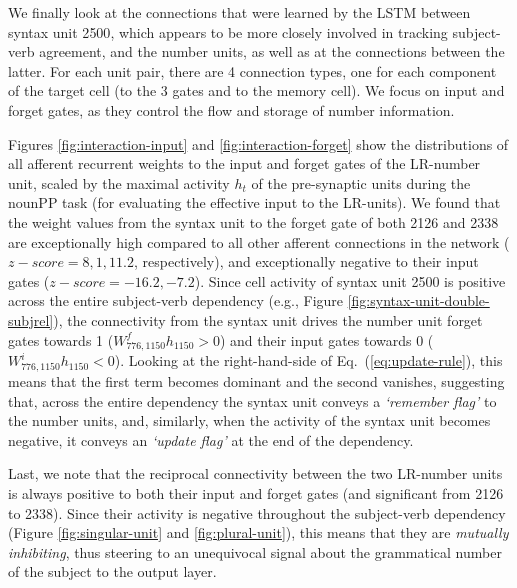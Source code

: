 We finally look at the connections that were learned by the LSTM
between syntax unit \unit{2}{500}, which appears to be more closely involved in
tracking subject-verb agreement, and the number units, as well as at
the connections between the latter. For each unit pair, there are 4
connection types, one for each component of the target cell (to the 3
gates and to the memory cell). We focus on input and forget gates, as they control the flow and storage of number information.

Figures \ref{fig:interaction-input} and \ref{fig:interaction-forget} show the distributions of all afferent recurrent weights to the input and forget gates of the LR-number unit, scaled by the maximal activity $h_t$ of the pre-synaptic units during the nounPP task (for evaluating the effective input to the LR-units). We found that the weight values from the syntax unit to the forget gate of both \unit{2}{126} and \unit{2}{338} are exceptionally high compared to all other afferent connections in the network ($z-score=8,1, 11.2$, respectively), and exceptionally negative to their input gates ($z-score=-16.2, -7.2$). Since cell activity of syntax unit \unit{2}{500} is positive across the entire subject-verb dependency (e.g., Figure
\ref{fig:syntax-unit-double-subjrel}), the connectivity from the
syntax unit drives the number unit forget gates towards 1
($W^f_{776, 1150}h_{1150}>0$) and their input gates towards 0
($W^i_{776, 1150}h_{1150}<0$). Looking at the right-hand-side of
Eq.~(\ref{eq:update-rule}), this means that the first term becomes
  dominant and the second vanishes, suggesting that, across the entire
  dependency the syntax unit conveys a \textit{`remember flag'}
  to the number units, and, similarly, when the activity of the syntax
  unit becomes negative, it conveys an \textit{`update
    flag'} at the end of the dependency.

Last, we note that the reciprocal connectivity between the two LR-number units is always positive to both their input and forget gates (and significant from  \unit{2}{126} to \unit{2}{338}). Since their activity is negative throughout the subject-verb dependency (Figure \ref{fig:singular-unit} and \ref{fig:plural-unit}), this means that they are \textit{mutually inhibiting}, thus steering to an unequivocal signal about the grammatical number of the subject to the output layer.

